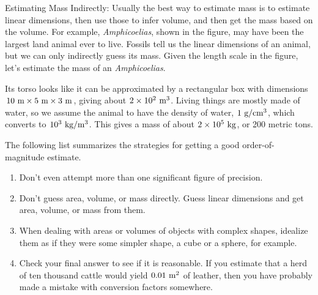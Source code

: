 
\begin{exmp}\label{eg:amphicoelias}
Estimating Mass Indirectly: Usually the best way to estimate mass is to estimate linear dimensions, then use those to infer volume, and then get the mass based on the volume.
For example, \emph{Amphicoelias}, shown in the figure, may have been the largest
land animal ever to live. Fossils tell us the linear dimensions of an animal,
but we can only indirectly guess its mass. Given the length scale in the figure,
let's estimate the mass of an \emph{Amphicoelias}.

Its torso looks like it can be approximated by a rectangular box with dimensions
$10\ \munit\times5\ \munit\times3\ \munit$, giving about $2\times10^2\ \munit^3$. Living things
are mostly made of water, so we assume the animal to have the density of water,
$1\ \zu{g}/\zu{cm}^3$, which converts to $10^3\ \textup{kg}/\textup{m}^3$. This
gives a mass of about $2\times10^5\ \textup{kg}$, or 200 metric tons.
\end{exmp}
\divider
\vspace{2mm}

\piccaption{ \qquad }






The following list summarizes the strategies for getting a
good order-of-magnitude estimate.

\begin{enumerate}
\item Don't even attempt more than one significant figure of precision.

\item Don't guess area, volume, or mass directly. Guess linear
dimensions and get area, volume, or mass from them.

\item When dealing with areas or volumes of objects with
complex shapes, idealize them as if they were some simpler
shape, a cube or a sphere, for example.

\item Check your final answer to see if it is reasonable. If
you estimate that a herd of ten thousand cattle would yield
$0.01\ \textup{m}^2$ of leather, then you have probably made a mistake
with conversion factors somewhere.
\end{enumerate}



